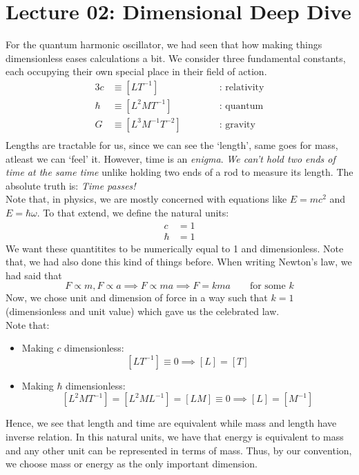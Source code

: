 \section*{Lecture 02: Dimensional Deep Dive}\label{sec:two}
For the quantum harmonic oscillator, we had seen that how making things dimensionless eases calculations a bit. We consider three fundamental constants, each occupying their own special place in their field of action.
\begin{alignat*}{3}
    c &\equiv [LT^{-1}] &&\qquad \text{ : relativity}\\
    \hbar &\equiv [L^2MT^{-1}] &&\qquad \text{ : quantum}\\
    G &\equiv [L^3M^{-1}T^{-2}] &&\qquad \text{ : gravity}\\
\end{alignat*}
Lengths are tractable for us, since we can see the `length', same goes for mass, atleast we can `feel' it. However, time is an \textit{enigma}. \textit{We can't hold two ends of time at the same time} unlike holding two ends of a rod to measure its length. The absolute truth is: \textit{Time passes!}\\[0.2cm]
Note that, in physics, we are mostly concerned with equations like $E=mc^2$ and $E=\hbar\omega$. To that extend, we define the natural units: 
\begin{align*}
    c &= 1 \\
    \hbar &=1 
\end{align*}
We want these quantitites to be numerically equal to 1 and dimensionless. Note that, we had also done this kind of things before. When writing Newton's law, we had said that $$F\propto m, F\propto a \implies F \propto ma \implies F=kma \qquad \text{for some } k$$
Now, we chose unit and dimension of force in a way such that $k=1$ (dimensionless and unit value) which gave us the celebrated law. \\[0.2cm]
Note that: 
\begin{itemize}
    \item Making $c$ dimensionless: 
    $$[LT^{-1}] \equiv 0 \implies [L] = [T]$$
    \item Making $\hbar$ dimensionless:
    $$[L^2 MT^{-1}] = [L^2M L^{-1}] = [LM] \equiv 0 \implies [L] = [M^{-1}]$$
\end{itemize}
Hence, we see that length and time are equivalent while mass and length have inverse relation. In this natural units, we have that energy is equivalent to mass and any other unit can be represented in terms of mass. Thus, by our convention, we choose mass or energy as the only important dimension.  \\[0.2cm]

